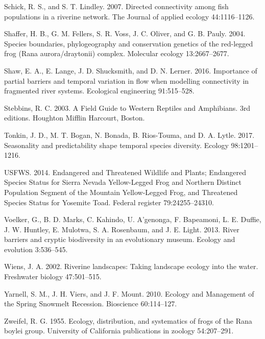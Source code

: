 \documentclass[twoside,12pt,final]{ucthesis-CA2012}
\begin{document}
\begin{ucmainmatter}
\leavevmode\hypertarget{ref-schick_directed_2007}{}%
Schick, R. S., and S. T. Lindley. 2007. Directed connectivity among fish
populations in a riverine network. The Journal of applied ecology
44:1116--1126.

\leavevmode\hypertarget{ref-shaffer_species_2004}{}%
Shaffer, H. B., G. M. Fellers, S. R. Voss, J. C. Oliver, and G. B.
Pauly. 2004. Species boundaries, phylogeography and conservation
genetics of the red-legged frog (Rana aurora/draytonii) complex.
Molecular ecology 13:2667--2677.

\leavevmode\hypertarget{ref-shaw_importance_2016}{}%
Shaw, E. A., E. Lange, J. D. Shucksmith, and D. N. Lerner. 2016.
Importance of partial barriers and temporal variation in flow when
modelling connectivity in fragmented river systems. Ecological
engineering 91:515--528.

\leavevmode\hypertarget{ref-stebbins_field_2003}{}%
Stebbins, R. C. 2003. A Field Guide to Western Reptiles and Amphibians.
3rd editions. Houghton Mifflin Harcourt, Boston.

\leavevmode\hypertarget{ref-tonkin_seasonality_2017}{}%
Tonkin, J. D., M. T. Bogan, N. Bonada, B. Rios-Touma, and D. A. Lytle.
2017. Seasonality and predictability shape temporal species diversity.
Ecology 98:1201--1216.

\leavevmode\hypertarget{ref-usfws_endangered_2014}{}%
USFWS. 2014. Endangered and Threatened Wildlife and Plants; Endangered
Species Status for Sierra Nevada Yellow-Legged Frog and Northern
Distinct Population Segment of the Mountain Yellow-Legged Frog, and
Threatened Species Status for Yosemite Toad. Federal register
79:24255--24310.

\leavevmode\hypertarget{ref-voelker_river_2013}{}%
Voelker, G., B. D. Marks, C. Kahindo, U. A'genonga, F. Bapeamoni, L. E.
Duffie, J. W. Huntley, E. Mulotwa, S. A. Rosenbaum, and J. E. Light.
2013. River barriers and cryptic biodiversity in an evolutionary museum.
Ecology and evolution 3:536--545.

\leavevmode\hypertarget{ref-wiens_riverine_2002}{}%
Wiens, J. A. 2002. Riverine landscapes: Taking landscape ecology into
the water. Freshwater biology 47:501--515.

\leavevmode\hypertarget{ref-yarnell_ecology_2010}{}%
Yarnell, S. M., J. H. Viers, and J. F. Mount. 2010. Ecology and
Management of the Spring Snowmelt Recession. Bioscience 60:114--127.

\leavevmode\hypertarget{ref-zweifel_ecology_1955}{}%
Zweifel, R. G. 1955. Ecology, distribution, and systematics of frogs of
the Rana boylei group. University of California publications in zoology
54:207--291.

\end{ucmainmatter}
\end{document}
